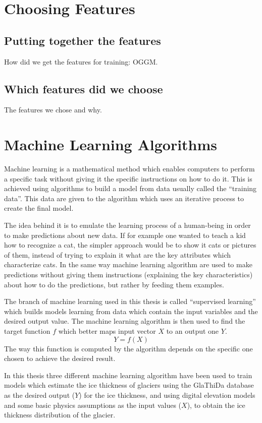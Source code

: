 \section{Choosing Features}\label{features}

\subsection{Putting together the features}
How did we get the features for training: OGGM.

\subsection{Which features did we choose}
The features we chose and why.

\section{Machine Learning Algorithms}\label{ML}
Machine learning is a mathematical method which enables computers to perform a specific task without giving it the specific instructions on how to do it. This is achieved using algorithms to build a model from data usually called the ``training data''. This data are given to the algorithm which uses an iterative process to create the final model. 

The idea behind it is to emulate the learning process of a human-being in order to make predictions about new data. If for example one wanted to teach a kid how to recognize a cat, the simpler approach would be to show it cats or pictures of them, instead of trying to explain it what are the key attributes which characterize cats. In the same way machine learning algorithm are used to make predictions without giving them instructions (explaining the key characteristics) about how to do the predictions, but rather by feeding them examples.

The branch of machine learning used in this thesis is called ``supervised learning'' which builds models learning from data which contain the input variables and the desired output value.
The machine learning algorithm is then used to find the target function $f$ which better maps input vector $X$ to an output one $Y$.
\begin{equation}
Y = f(X)
\end{equation}
The way this function is computed by the algorithm depends on the specific one chosen to achieve the desired result.

In this thesis three different machine learning algorithm have been used to train models which estimate the ice thickness of glaciers using the GlaThiDa database as the desired output ($Y$) for the ice thickness, and using digital elevation models and some basic physics assumptions as the input values ($X$), to obtain the ice thickness distribution of the glacier.


